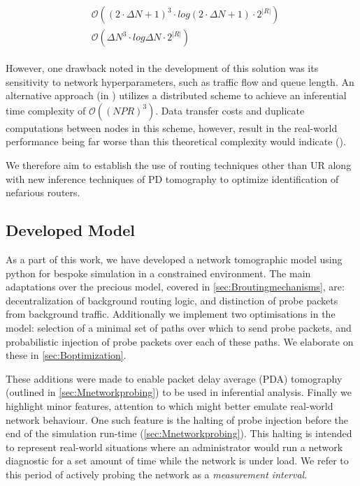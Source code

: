 \begin{align}
\label{eq:mcmcbigo}
    \begin{split}
        &\mathcal{O}( (2\cdot \Delta N + 1)^3 \cdot log(2\cdot \Delta N + 1)\cdot 2^{|R|})\\
        &\mathcal{O}(\Delta N ^3 \cdot log \Delta N \cdot 2^{|R|})
    \end{split}
\end{align}\par
However, one drawback noted in the development of this solution was its sensitivity to network hyperparameters, such as traffic flow and queue length. An alternative approach (in \cite{kolar_distributed_2020}) utilizes a distributed scheme to achieve an inferential time complexity of $\mathcal{O}((NPR)^3)$. Data transfer costs and duplicate computations between nodes in this scheme, however, result in the real-world performance being far worse than this theoretical complexity would indicate (\cite{kolar_distributed_2020}).\par
We therefore aim to establish the use of routing techniques other than UR along with new inference techniques of PD tomography to optimize identification of nefarious routers.\par

\subsection{Developed Model}
\label{ssec:Idevelopedmodels}
As a part of this work, we have developed a network tomographic model using python for bespoke simulation in a constrained environment. The main adaptations over the precious model, covered in \cref{sec:Broutingmechanisms}, are: decentralization of background routing logic, and distinction of probe packets from background traffic. Additionally we implement two optimisations in the model: selection of a minimal set of paths over which to send probe packets, and probabilistic injection of probe packets over each of these paths. We elaborate on these in \cref{sec:Boptimization}.\par
These additions were made to enable packet delay average (PDA) tomography (outlined in \cref{sec:Mnetworkprobing}) to be used in inferential analysis. Finally we highlight minor features, attention to which might better emulate real-world network behaviour. One such feature is the halting of probe injection before the end of the simulation run-time (\cref{sec:Mnetworkprobing}). This halting is intended to represent real-world situations where an administrator would run a network diagnostic for a set amount of time while the network is under load. We refer to this period of actively probing the network as a \textit{measurement interval}.

